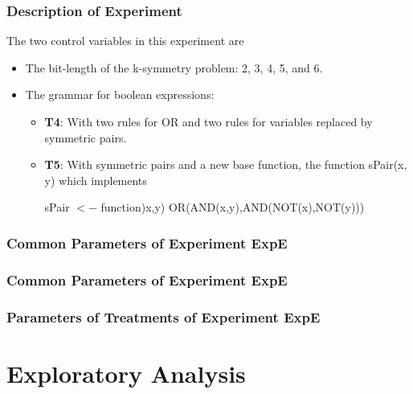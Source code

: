 \documentclass[18pt,c]{beamer}
\makeatletter
\let\beamer@writeslidentry@miniframeson=\beamer@writeslidentry
\newcommand*{\miniframeson}{\let\beamer@writeslidentry=\beamer@writeslidentry@miniframeson}
\makeatother
\begin{document}
\begin{frame}
\frametitle{
Description of Experiment
}
The two control variables in this experiment are
\begin{itemize}
\item The bit-length of the k-symmetry problem: 2, 3, 4, 5, and 6.
\item The grammar for boolean expressions:
\begin{itemize} 
\item {\bf T4}: With two rules for OR and two rules for variables replaced
            by symmetric pairs.
\item {\bf T5}: With symmetric pairs and a new base function,
       the function sPair(x, y) which implements
 
sPair $<-$ function)x,y) {OR(AND(x,y),AND(NOT(x),NOT(y)))}
\end{itemize}
\end{itemize}
\end{frame}%
 \begin{frame}
 \fontsize{8pt}{9pt}\selectfont
 \frametitle{ Common Parameters of Experiment ExpE }

 \label{ExpECommonTable000.tex}  
 \end{frame}

 \begin{frame}
 \fontsize{8pt}{9pt}\selectfont
 \frametitle{ Common Parameters of Experiment ExpE }

 \label{ExpECommonTable001.tex}  
 \end{frame}

 \begin{frame}
 \fontsize{8pt}{9pt}\selectfont
 \frametitle{ Parameters of Treatments of Experiment ExpE }

 \label{ExpEDifferentTable000.tex}  
 \end{frame}

\miniframeson
\section{Exploratory Analysis}
\miniframeson
\end{document}
